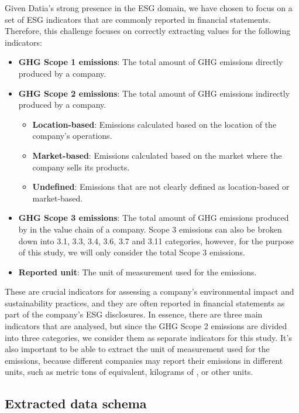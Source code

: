 \documentclass[english, 12pt, a4paper, elec, utf8, a-2b, online]{aaltothesis}
\begin{document}
Given Datia's strong presence in the \ac{ESG} domain, we have chosen to focus on a set of \ac{ESG} indicators that are commonly reported in financial statements.
Therefore, this challenge focuses on correctly extracting values for the following indicators:

\begin{itemize}
    \item \textbf{\ac{GHG} Scope 1 emissions}: The total amount of \ac{GHG} emissions directly produced by a company.
    \item \textbf{\ac{GHG} Scope 2 emissions}: The total amount of \ac{GHG} emissions indirectly produced by a company.
            \begin{itemize}
                \item \textbf{Location-based}: Emissions calculated based on the location of the company's operations.
                \item \textbf{Market-based}: Emissions calculated based on the market where the company sells its products.
                \item \textbf{Undefined}: Emissions that are not clearly defined as location-based or market-based.
            \end{itemize}
    \item \textbf{\ac{GHG} Scope 3 emissions}: The total amount of \ac{GHG} emissions produced by in the value chain of a company. Scope 3 emissions can also be broken down into 3.1, 3.3, 3.4, 3.6, 3.7 and 3.11 categories, however, for the purpose of this study, we will only consider the total Scope 3 emissions.
    \item \textbf{Reported unit}: The unit of measurement used for the emissions.
\end{itemize}

These are crucial indicators for assessing a company's environmental impact and sustainability practices, and they are often reported in financial statements as part of the company's \ac{ESG} disclosures.
In essence, there are three main indicators that are analysed, but since the \ac{GHG} Scope 2 emissions are divided into three categories, we consider them as separate indicators for this study.
It's also important to be able to extract the unit of measurement used for the emissions, because different companies may report their emissions in different units, such as metric tons of  equivalent, kilograms of , or other units.

\subsection{Extracted data schema}
\end{document}
